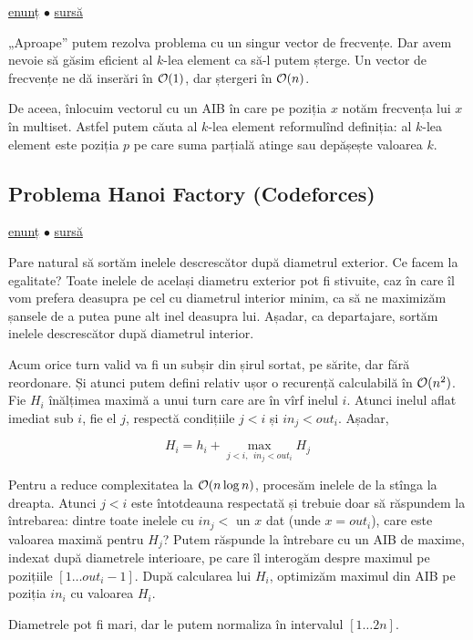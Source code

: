\documentclass[../main.tex]{subfiles}
\begin{document}
\href{https://codeforces.com/contest/1354/problem/D}{enunț}
$\bullet$
\hyperref[code:multiset]{sursă}

„Aproape” putem rezolva problema cu un singur vector de frecvențe. Dar avem nevoie să găsim eficient al $k$-lea element ca să-l putem șterge. Un vector de frecvențe ne dă inserări în $\mathcal{O}(1)$, dar ștergeri în $\mathcal{O}(n)$.

De aceea, înlocuim vectorul cu un AIB în care pe poziția $x$ notăm frecvența lui $x$ în multiset. Astfel putem căuta al $k$-lea element reformulînd definiția: al $k$-lea element este poziția $p$ pe care suma parțială atinge sau depășește valoarea $k$.

\subsection{Problema Hanoi Factory (Codeforces)}
\label{problem:hanoi-factory}

\href{https://codeforces.com/contest/777/problem/E}{enunț}
$\bullet$
\hyperref[code:hanoi-factory]{sursă}

Pare natural să sortăm inelele descrescător după diametrul exterior. Ce facem la egalitate? Toate inelele de același diametru exterior pot fi stivuite, caz în care îl vom prefera deasupra pe cel cu diametrul interior minim, ca să ne maximizăm șansele de a putea pune alt inel deasupra lui. Așadar, ca departajare, sortăm inelele descrescător după diametrul interior.

Acum orice turn valid va fi un subșir din șirul sortat, pe sărite, dar fără reordonare. Și atunci putem defini relativ ușor o recurență calculabilă în $\mathcal{O}(n^2)$. Fie $H_i$ înălțimea maximă a unui turn care are în vîrf inelul $i$. Atunci inelul aflat imediat sub $i$, fie el $j$, respectă condițiile $j < i$ și $in_j < out_i$. Așadar,

$$H_i = h_i + \max_{j < i,\ \ in_j < out_i} H_j$$

Pentru a reduce complexitatea la $\mathcal{O}(n \log n)$, procesăm inelele de la stînga la dreapta. Atunci $j < i$ este întotdeauna respectată și trebuie doar să răspundem la întrebarea: dintre toate inelele cu $in_j < $ un $x$ dat (unde $x = out_i$), care este valoarea maximă pentru $H_j$? Putem răspunde la întrebare cu un AIB de maxime, indexat după diametrele interioare, pe care îl interogăm despre maximul pe pozițiile $[1 \dots out_i - 1]$. După calcularea lui $H_i$, optimizăm maximul din AIB pe poziția $in_i$ cu valoarea $H_i$.

Diametrele pot fi mari, dar le putem normaliza în intervalul $[1 \dots 2n]$.
\end{document}
